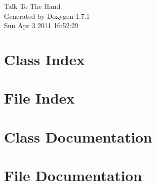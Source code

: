 \documentclass[a4paper]{book}
\begin{document}
\hypersetup{pageanchor=false}
\begin{titlepage}
\vspace*{7cm}
\begin{center}
{\Large Talk To The Hand }\\
\vspace*{1cm}
{\large Generated by Doxygen 1.7.1}\\
\vspace*{0.5cm}
{\small Sun Apr 3 2011 16:52:29}\\
\end{center}
\end{titlepage}
\clearemptydoublepage
{}
\tableofcontents
\clearemptydoublepage
{}
\hypersetup{pageanchor=true}
\chapter{Class Index}

\chapter{File Index}

\chapter{Class Documentation}








\chapter{File Documentation}
















\printindex
\end{document}
